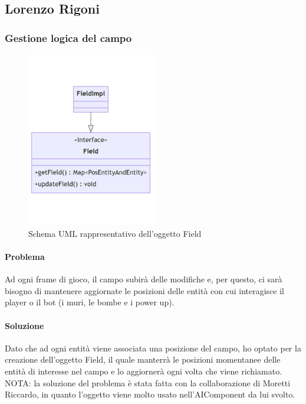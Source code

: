 \documentclass[a4paper,12pt]{report}
\begin{document}

\subsection*{Lorenzo Rigoni}

\subsubsection{Gestione logica del campo}

\begin{figure}[H]
    \centering{}
    \includegraphics[width=0.50\textwidth]{img/UMLGestioneCampo.png}
    \caption{Schema UML rappresentativo dell'oggetto Field}
    \label{}
\end{figure}

\paragraph{Problema} Ad ogni frame di gioco, il campo subirà delle modifiche e, per questo, ci sarà bisogno di mantenere aggiornate le posizioni delle entità con cui interagisce il player o il bot (i muri, le bombe e i power up).

\paragraph{Soluzione} Dato che ad ogni entità viene associata una posizione del campo, ho optato per la creazione dell’oggetto Field, il quale manterrà le posizioni momentanee delle entità di interesse nel campo e lo aggiornerà ogni volta che viene richiamato.
\\
NOTA: la soluzione del problema è stata fatta con la collaborazione di Moretti Riccardo, in quanto l’oggetto viene molto usato nell’AIComponent da lui svolto.
\end{document}
